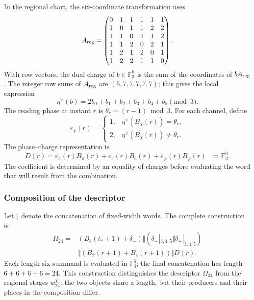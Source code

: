 In the regional chart, the six-coordinate transformation uses
\[
 A_{\rm reg}=
 \begin{pmatrix}
 0&1&1&1&1&1\\
 1&0&1&1&2&2\\
 1&1&0&2&1&2\\
 1&1&2&0&2&1\\
 1&2&1&2&0&1\\
 1&2&2&1&1&0
 \end{pmatrix}.
\]
With row vectors, the dual charge of $b\in\mathbb F_3^6$ is the sum
of the coordinates of $bA_{\rm reg}$. The integer row sums of
$A_{\rm reg}$ are $(5,7,7,7,7,7)$; this gives the local expression
\begin{equation}
 \eta^\vee(b)=2b_0+b_1+b_2+b_3+b_4+b_5\pmod3.
 \label{act21:eq:kdes-cargadual}
\end{equation}
The reading phase at instant $r$ is
$\theta_r=(r-1)\bmod3$. For each channel, define
\[
 \varepsilon_\chi(r)=
 \begin{cases}
 1,&\eta^\vee(B_\chi(r))=\theta_r,\\
 2,&\eta^\vee(B_\chi(r))\ne\theta_r.
 \end{cases}
\]
The phase--charge representation is
\begin{equation}
 D(r)=\varepsilon_\pi(r)B_\pi(r)
      +\varepsilon_e(r)B_e(r)
      +\varepsilon_\varphi(r)B_\varphi(r)
      \quad\text{in }\mathbb F_3^6.
 \label{act21:eq:kdes-fasecarga}
\end{equation}
The coefficient is determined by an equality of charges before evaluating
the word that will result from the combination.

\subsubsection{Composition of the descriptor}

Let $\Vert$ denote the concatenation of fixed-width words.
The complete construction is
\begin{equation}
 \begin{split}
 \Omega_{24}={}&
 (B_e(t_*+1)+\delta_-)
 \Vert (\delta_-|_{3,4,5}\Vert\delta_+|_{3,4,5})\\
 &\Vert(B_\pi(r+1)+B_e(r+1))\Vert D(r).
 \end{split}
 \label{act21:eq:kdes-omega}
\end{equation}
Each length-six summand is evaluated in $\mathbb F_3^6$; the
final concatenation has length $6+6+6+6=24$. This construction
distinguishes the descriptor $\Omega_{24}$ from the regional stages
$w_{24}^{\chi}$: the two objects share a length, but their producers
and their places in the composition differ.

